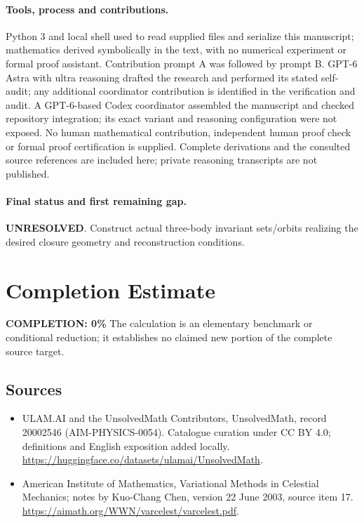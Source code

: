 \documentclass[11pt]{article}
\begin{document}
\paragraph{Tools, process and contributions.}
Python 3 and local shell used to read supplied files and serialize this manuscript; mathematics derived symbolically in the text, with no numerical experiment or formal proof assistant. Contribution prompt A was followed by prompt B. GPT-6 Astra with ultra reasoning drafted the research and performed its stated self-audit; any additional coordinator contribution is identified in the verification and audit. A GPT-6-based Codex coordinator assembled the manuscript and checked repository integration; its exact variant and reasoning configuration were not exposed. No human mathematical contribution, independent human proof check or formal proof certification is supplied. Complete derivations and the consulted source references are included here; private reasoning transcripts are not published.

\paragraph{Final status and first remaining gap.}
\textbf{UNRESOLVED}. Construct actual three-body invariant sets/orbits realizing the desired closure geometry and reconstruction conditions.

\section{Completion Estimate}
\noindent\textbf{COMPLETION: 0\%}
The calculation is an elementary benchmark or conditional reduction; it establishes no claimed new portion of the complete source target.

\subsection{Sources}
\begin{itemize}
\item[\hypertarget{source:20002546:1}{S1}] ULAM.AI and the UnsolvedMath Contributors, UnsolvedMath, record 20002546 (AIM-PHYSICS-0054). Catalogue curation under CC BY 4.0; definitions and English exposition added locally.
\url{https://huggingface.co/datasets/ulamai/UnsolvedMath}.
\item[\hypertarget{source:20002546:2}{S2}] American Institute of Mathematics, Variational Methods in Celestial Mechanics; notes by Kuo-Chang Chen, version 22 June 2003, source item 17.
\url{https://aimath.org/WWN/varcelest/varcelest.pdf}.
\end{itemize}
\label{end:20002546}
\end{document}
